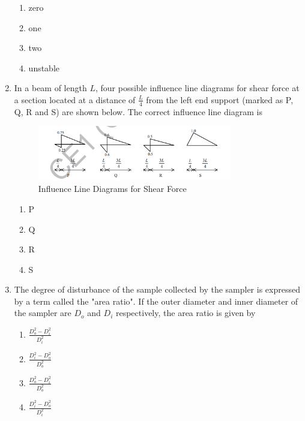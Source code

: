 \documentclass[journal,12pt,onecolumn]{IEEEtran}
\theoremstyle{remark}
\begin{document}
\begin{enumerate}
\begin{multicols}{2}
\begin{enumerate}
\item zero
\item one
\item two
\item unstable
\end{enumerate}
\end{multicols}

\item In a beam of length $L$, four possible influence line diagrams for shear force at a section located at a distance of $\frac{L}{4}$ from the left end support (marked as P, Q, R and S) are shown below. The correct influence line diagram is \hfill{}

\begin{figure}[H]
    \centering
    \includegraphics[width=0.8\textwidth]{figs/image6.png}
    \caption{Influence Line Diagrams for Shear Force}
    \label{fig:influence-line-diagrams}
\end{figure}

\begin{multicols}{2}
\begin{enumerate}
\item P
\item Q
\item R
\item S
\end{enumerate}
\end{multicols}

\item The degree of disturbance of the sample collected by the sampler is expressed by a term called the "area ratio". If the outer diameter and inner diameter of the sampler are $D_o$ and $D_i$ respectively, the area ratio is given by \hfill{} \\

\begin{multicols}{2}
\begin{enumerate}
\item $\frac{D_o^2 - D_i^2}{D_i^2}$
\item $\frac{D_i^2 - D_o^2}{D_o^2}$
\item $\frac{D_o^2 - D_i^2}{D_o^2}$
\item $\frac{D_i^2 - D_o^2}{D_i^2}$
\end{enumerate}
\end{multicols}




\end{enumerate}
\end{document}
